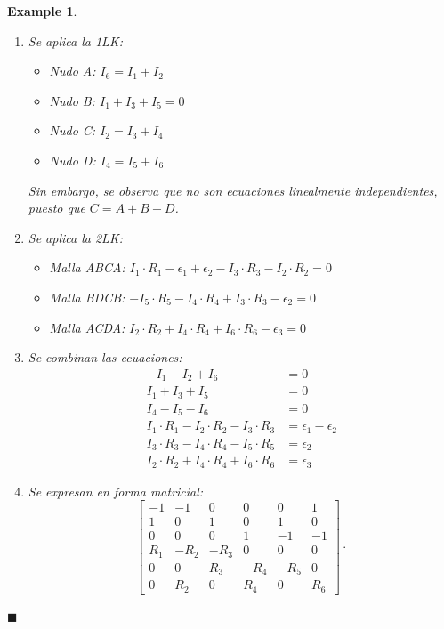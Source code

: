 \documentclass[11pt]{book} %
\numberwithin{dummy}{section}
\theoremstyle{ocrenumbox}
\theoremstyle{blacknumex}
\newtheorem{exampleT}{Example}[chapter]
\theoremstyle{blacknumbox}
\theoremstyle{ocrenum}
\newenvironment{example}{\begin{exampleT}}{\hfill{\tiny\ensuremath{\blacksquare}}\end{exampleT}}
\begin{document}
\begin{example}
		\begin{enumerate}
			\item {Se aplica la 1LK:} 
			\begin{itemize}
				\item {Nudo A:} $I_6 = I_1 + I_2$
				\item {Nudo B:} $I_1 + I_3 + I_5 = 0$
				\item {Nudo C:} $I_2 = I_3 + I_4$
				\item {Nudo D:} $I_4 = I_5 + I_6$
			\end{itemize}
			Sin embargo, se observa que no son ecuaciones linealmente independientes, puesto que $C=A+B+D$.
			\item {Se aplica la 2LK:}
			\begin{itemize}
				\item {Malla ABCA:} $I_1 \cdot R_1 - \epsilon_1 + \epsilon_2 - I_3 \cdot R_3 - I_2 \cdot R_2 = 0$
				\item {Malla BDCB:} $-I_5 \cdot R_5 - I_4 \cdot R_4 + I_3 \cdot R_3 - \epsilon_2 = 0$
				\item {Malla ACDA:} $I_2 \cdot R_2 + I_4 \cdot R_4 + I_6 \cdot R_6 - \epsilon_3 = 0$
			\end{itemize}
			\item {Se combinan las ecuaciones:}
			\begin{align*}
				- I_1 -  I_2 + I_6  &= 0\\
				I_1 + I_3 + I_5 &= 0\\
				I_4 - I_5 - I_6 &= 0\\
				I_1 \cdot R_1 - I_2 \cdot R_2 - I_3 \cdot R_3 &= \epsilon_1 - \epsilon_2\\
				I_3 \cdot R_3 - I_4 \cdot R_4 -I_5 \cdot R_5 &= \epsilon_2\\
				I_2 \cdot R_2 + I_4 \cdot R_4 + I_6 \cdot R_6 &= \epsilon_3
			\end{align*}
			\item {Se expresan en forma matricial:}
			\begin{equation*}
				\begin{bmatrix}
					-1 & -1 & 0 & 0 & 0 & 1\\
					1 & 0 & 1 & 0 & 1 & 0\\
					0 & 0 & 0 & 1 & -1 & -1\\
					R_1 & -R_2 & - R_3 & 0 & 0 & 0\\
					0 & 0 & R_3 & - R_4 & - R_5 & 0\\
					0 & R_2 & 0 & R_4 & 0 & R_6
				\end{bmatrix} \cdot %

\end{equation*}
\end{enumerate}
\end{example}
\end{document}

